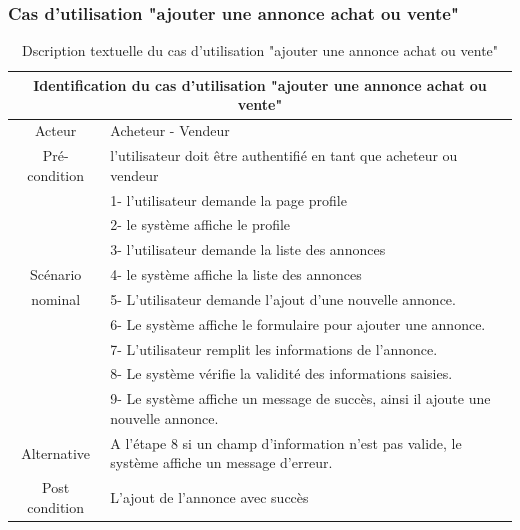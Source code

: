 \documentclass[edit,12pt,a4paper,ChapStyle,oneside,doubleinterligne]{report}
\begin{document}
\subsubsection{Cas d'utilisation "ajouter une annonce achat ou vente"}
\begin{table}[h!]
    \centering
    \begin{tabular}{|c|m{10cm}|}
    \hline
         \multicolumn{2}{|c|}{Identification du cas d'utilisation "ajouter une annonce achat ou vente" }\\
         \hline
         Acteur & Acheteur - Vendeur \\
         \hline
         Pré-condition & l’utilisateur doit être authentifié en tant que acheteur ou vendeur \\
         \hline
          & 1- l'utilisateur demande la page profile\\
          & 2- le système affiche le profile\\
          & 3- l'utilisateur demande la liste des annonces\\
          Scénario& 4- le système affiche la liste des annonces\\
          nominal& 5- L’utilisateur demande l’ajout d’une nouvelle annonce. \\
          & 6- Le système affiche le formulaire pour ajouter une annonce.\\
          & 7- L’utilisateur remplit les informations de l’annonce. \\
          & 8- Le système vérifie la validité des informations saisies. \\
       & 9- Le système affiche un message de succès, ainsi il ajoute une
          nouvelle annonce. \\
         \hline
         Alternative  & A l’étape 8 si un champ d’information n’est pas valide, le
         système affiche un message d’erreur.\\
         \hline
         Post condition & L’ajout de l’annonce avec succès \\
         \hline
    \end{tabular}
    \caption{Dscription textuelle du cas d'utilisation "ajouter une annonce achat ou vente" }
    \label{tab:cas 6}
\end{table}
\end{document}
